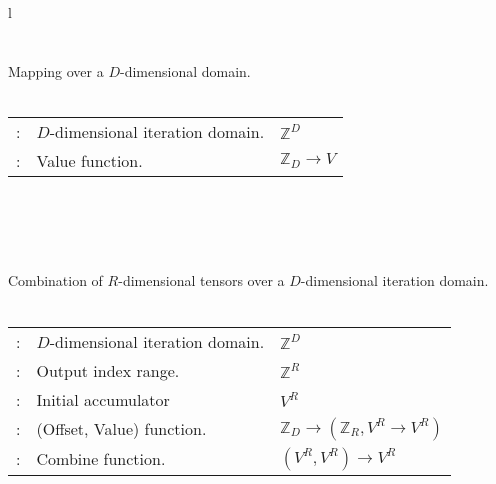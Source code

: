 \begin{figure*}
\fontsize{10}{11}
\selectfont
\begin{tabular}{l}
 \\ \midrule
{} \\
\vspace{-7pt} \\
Mapping over a $D$-dimensional domain. \\
\vspace{-8pt} \\
{
\begin{tabular}{lll}
\argg{d}: & \hspace{-7pt}$D$-dimensional iteration domain. & $\mathbb{Z}^D$ \\
\argg{m}: & \hspace{-7pt}Value function.   & $\mathbb{Z}_D\rightarrow V$ \\
\end{tabular}
}
\\
\\
 \\
\vspace{-7pt} \\
Combination of $R$-dimensional tensors over a $D$-dimensional iteration domain. \\
\vspace{-8pt} \\
{
\begin{tabular}{lll}
\argg{d}: & \hspace{-7pt}$D$-dimensional iteration domain. & $\mathbb{Z}^D$ \\
\argg{r}: & \hspace{-7pt}Output index range.         & $\mathbb{Z}^R$ \\
\argg{z}: & \hspace{-7pt}Initial accumulator         & $V^R$ \\
\argg{f}: & \hspace{-7pt}(Offset, Value) function.   & $\mathbb{Z}_D \rightarrow (\mathbb{Z}_R, V^R \rightarrow V^R)$ \\
\argg{c}: & \hspace{-7pt}Combine function.           & $(V^R, V^R) \rightarrow V^R$ \\
\end{tabular}
}
\\
\\ \\
 \\ \midrule

\end{tabular}
\end{figure*}
